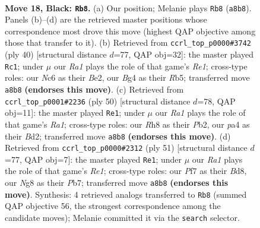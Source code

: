 \documentclass[11pt]{article}
\begin{document}
\clearpage

\begin{figure}[p]\centering
\begin{subfigure}{0.46\textwidth}\centering
\resizebox{\linewidth}{!}{%
\newchessgame
\chessboard[
  setfen={r3k1nr/5ppp/p1n5/4P2P/P5b1/1P3N2/4BKP1/RN5R b kq - 0 18},
  showmover=false,
  pgfstyle=straightmove, color=movearrow, markmove={a8-b8}
]}
\caption{}
\end{subfigure}\hfill
\begin{subfigure}{0.46\textwidth}\centering
\resizebox{\linewidth}{!}{%
\newchessgame
\chessboard[
  setfen={r5k1/5pbp/1p1r2p1/nR6/2p5/5N1P/PP2BPP1/4R1K1 w - - 0 21},
  showmover=false,
  pgfstyle=straightmove, color=movearrow, markmove={e1-c1}
]}
\caption{}
\end{subfigure}
\\[4pt]
\begin{subfigure}{0.46\textwidth}\centering
\resizebox{\linewidth}{!}{%
\newchessgame
\chessboard[
  setfen={r3r1k1/1R2n1pp/3p1p2/p1p2P2/P1P5/7P/1P1B1P2/R5K1 w - - 1 26},
  showmover=false,
  pgfstyle=straightmove, color=movearrow, markmove={a1-e1}
]}
\caption{}
\end{subfigure}\hfill
\begin{subfigure}{0.46\textwidth}\centering
\resizebox{\linewidth}{!}{%
\newchessgame
\chessboard[
  setfen={3br1k1/pp4pp/2p5/P7/1P1P2n1/N1P3P1/6KP/R1B5 b - - 1 26},
  showmover=false,
  pgfstyle=straightmove, color=movearrow, markmove={e8-e1}
]}
\caption{}
\end{subfigure}
\caption{\textbf{Move 18, Black: \texttt{Rb8}.} (a) Our position; Melanie plays \texttt{Rb8} (\texttt{a8b8}). Panels (b)--(d) are the retrieved master positions whose correspondence most drove this move (highest QAP objective among those that transfer to it). (b) Retrieved from \texttt{ccrl\_top\_p0000\#3742} (ply 40) [structural distance $d$=77, QAP obj=32]: the master played \texttt{Rc1}; under $\mu$ our \emph{Ra1} plays the role of that game's \emph{Re1}; cross-type roles: our \emph{N}c6 as their \emph{B}e2, our \emph{B}g4 as their \emph{R}b5; transferred move \texttt{a8b8} \textbf{(endorses this move)}. (c) Retrieved from \texttt{ccrl\_top\_p0001\#2236} (ply 50) [structural distance $d$=78, QAP obj=11]: the master played \texttt{Re1}; under $\mu$ our \emph{Ra1} plays the role of that game's \emph{Ra1}; cross-type roles: our \emph{R}h8 as their \emph{P}b2, our \emph{p}a4 as their \emph{B}d2; transferred move \texttt{a8b8} \textbf{(endorses this move)}. (d) Retrieved from \texttt{ccrl\_top\_p0000\#2312} (ply 51) [structural distance $d$=77, QAP obj=7]: the master played \texttt{Re1}; under $\mu$ our \emph{Ra1} plays the role of that game's \emph{Re1}; cross-type roles: our \emph{P}f7 as their \emph{B}d8, our \emph{N}g8 as their \emph{P}b7; transferred move \texttt{a8b8} \textbf{(endorses this move)}. Synthesis: 4 retrieved analogs transferred to \texttt{Rb8} (summed QAP objective 56, the strongest correspondence among the candidate moves); Melanie committed it via the \texttt{search} selector.}
\label{fig:thought-m35}
\end{figure}
\end{document}
